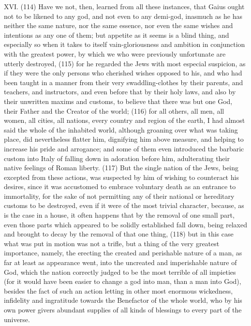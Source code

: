 XVI. (114) Have we not, then, learned from all these instances, that Gaius ought not to be likened
to any god, and not even to any demi-god, inasmuch as he has neither the same nature, nor the
same essence, nor even the same wishes and intentions as any one of them; but appetite as it
seems is a blind thing, and especially so when it takes to itself vain-gloriousness and ambition in
conjunction with the greatest power, by which we who were previously unfortunate are utterly
destroyed, (115) for he regarded the Jews with most especial suspicion, as if they were the only
persons who cherished wishes opposed to his, and who had been taught in a manner from their
very swaddling-clothes by their parents, and teachers, and instructors, and even before that by
their holy laws, and also by their unwritten maxims and customs, to believe that there was but one
God, their Father and the Creator of the world; (116) for all others, all men, all women, all cities, all
nations, every country and region of the earth, I had almost said the whole of the inhabited world,
although groaning over what was taking place, did nevertheless flatter him, dignifying him above
measure, and helping to increase his pride and arrogance; and some of them even introduced the
barbaric custom into Italy of falling down in adoration before him, adulterating their native feelings
of Roman liberty. (117) But the single nation of the Jews, being excepted from these actions, was
suspected by him of wishing to counteract his desires, since it was accustomed to embrace
voluntary death as an entrance to immortality, for the sake of not permitting any of their national or
hereditary customs to be destroyed, even if it were of the most trivial character, because, as is the
case in a house, it often happens that by the removal of one small part, even those parts which
appeared to be solidly established fall down, being relaxed and brought to decay by the removal of
that one thing, (118) but in this case what was put in motion was not a trifle, but a thing of the very
greatest importance, namely, the erecting the created and perishable nature of a man, as far at
least as appearance went, into the uncreated and imperishable nature of God, which the nation
correctly judged to be the most terrible of all impieties (for it would have been easier to change a
god into man, than a man into God), besides the fact of such an action letting in other most
enormous wickedness, infidelity and ingratitude towards the Benefactor of the whole world, who by
his own power givers abundant supplies of all kinds of blessings to every part of the universe.

